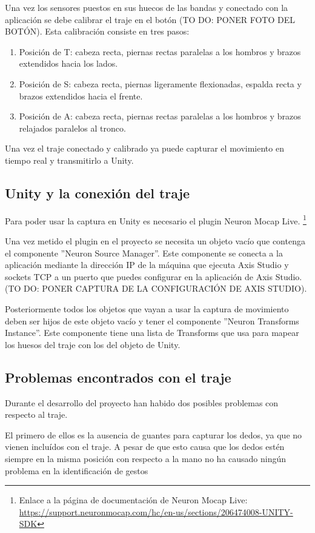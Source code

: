 Una vez los sensores puestos en sus huecos de las bandas y conectado con la aplicación se debe calibrar el traje en el botón (TO DO: PONER FOTO DEL BOTÓN).
Esta calibración consiste en tres pasos:
\begin{enumerate}
    \item Posición de T: cabeza recta, piernas rectas paralelas a los hombros y brazos extendidos hacia los lados.
    \item Posición de S: cabeza recta, piernas ligeramente flexionadas, espalda recta y brazos extendidos hacia el frente.
    \item Posición de A: cabeza recta, piernas rectas paralelas a los hombros y brazos relajados paralelos al tronco.
\end{enumerate}

Una vez el traje conectado y calibrado ya puede capturar el movimiento en tiempo real y transmitirlo a Unity.
\subsection{Unity y la conexión del traje}
\label{subsec:NeuronMocapLive}
Para poder usar la captura en Unity es necesario el plugin Neuron Mocap Live. \footnote{Enlace a la página de documentación de Neuron Mocap Live: \url{https://support.neuronmocap.com/hc/en-us/sections/206474008-UNITY-SDK}}

Una vez metido el plugin en el proyecto se necesita un objeto vacío que contenga el componente ''Neuron Source Manager''.
Este componente se conecta a la aplicación mediante la dirección IP de la máquina que ejecuta Axis Studio y sockets TCP a un puerto que puedes configurar en la aplicación de Axis Studio. (TO DO: PONER CAPTURA DE LA CONFIGURACIÓN DE AXIS STUDIO).

Posteriormente todos los objetos que vayan a usar la captura de movimiento deben ser hijos de este objeto vacío y tener el componente ''Neuron Transforms Instance''.
Este componente tiene una lista de Transforms que usa para mapear los huesos del traje con los del objeto de Unity.

\subsection{Problemas encontrados con el traje}
Durante el desarrollo del proyecto han habido dos posibles problemas con respecto al traje.

El primero de ellos es la ausencia de guantes para capturar los dedos, ya que no vienen incluídos con el traje.
A pesar de que esto causa que los dedos estén siempre en la misma posición con respecto a la mano no ha causado ningún problema en la identificación de gestos

